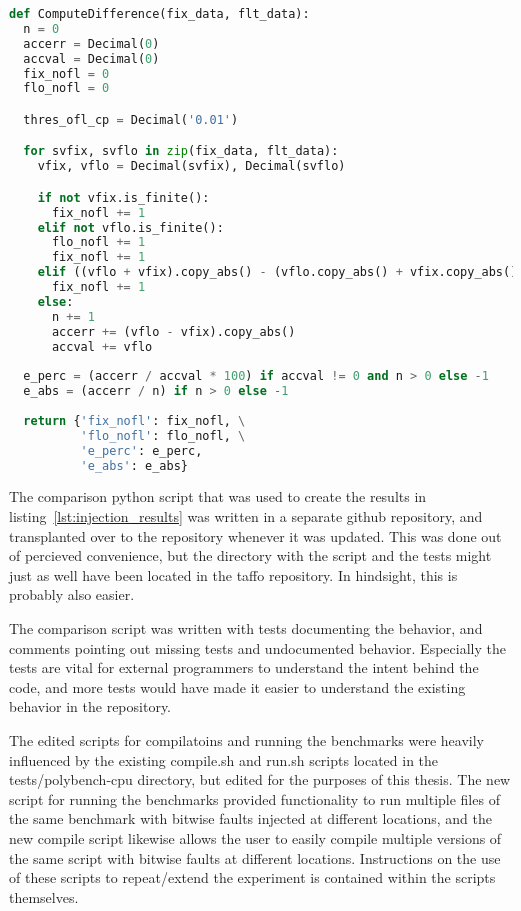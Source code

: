 \begin{lstlisting}[label=lst:validate_original,caption=Validate original,language=python]
def ComputeDifference(fix_data, flt_data):
  n = 0
  accerr = Decimal(0)
  accval = Decimal(0)
  fix_nofl = 0
  flo_nofl = 0

  thres_ofl_cp = Decimal('0.01')

  for svfix, svflo in zip(fix_data, flt_data):
    vfix, vflo = Decimal(svfix), Decimal(svflo)

    if not vfix.is_finite():
      fix_nofl += 1
    elif not vflo.is_finite():
      flo_nofl += 1
      fix_nofl += 1
    elif ((vflo + vfix).copy_abs() - (vflo.copy_abs() + vfix.copy_abs())) > thres_ofl_cp:
      fix_nofl += 1
    else:
      n += 1
      accerr += (vflo - vfix).copy_abs()
      accval += vflo
      
  e_perc = (accerr / accval * 100) if accval != 0 and n > 0 else -1
  e_abs = (accerr / n) if n > 0 else -1
      
  return {'fix_nofl': fix_nofl, \
          'flo_nofl': flo_nofl, \
          'e_perc': e_perc,
          'e_abs': e_abs}
\end{lstlisting}




The comparison python script that was used to create the results in listing~\ref{lst:injection_results} was written in a separate github repository, and transplanted over to the \taffo{} repository whenever it was updated. This was done out of percieved convenience, but the directory with the script and the tests might just as well have been located in the taffo repository. In hindsight, this is probably also easier.

The comparison script was written with tests documenting the behavior, and comments pointing out missing tests and undocumented behavior. Especially the tests are vital for external programmers to understand the intent behind the code, and more tests would have made it easier to understand the existing behavior in the \taffo{} repository. 

The edited scripts for compilatoins and running the benchmarks were heavily influenced by the existing compile.sh and run.sh scripts located in the tests/polybench-cpu directory, but edited for the purposes of this thesis. The new script for running the benchmarks provided functionality to run multiple files of the same benchmark with bitwise faults injected at different locations, and the new compile script likewise allows the user to easily compile multiple versions of the same script with bitwise faults at different locations. Instructions on the use of these scripts to repeat/extend the experiment is contained within the scripts themselves.


